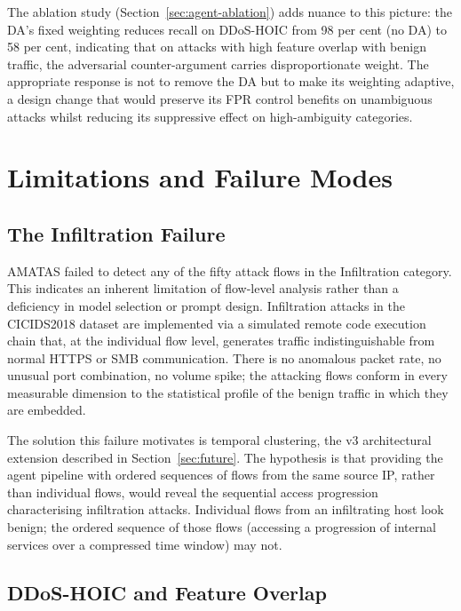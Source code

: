 \documentclass[../main.tex]{subfiles}
\begin{document}
The ablation study (Section~\ref{sec:agent-ablation}) adds nuance to this picture: the DA's fixed weighting reduces recall on DDoS-HOIC from 98 per cent (no DA) to 58 per cent, indicating that on attacks with high feature overlap with benign traffic, the adversarial counter-argument carries disproportionate weight. The appropriate response is not to remove the DA but to make its weighting adaptive, a design change that would preserve its FPR control benefits on unambiguous attacks whilst reducing its suppressive effect on high-ambiguity categories.

\section{Limitations and Failure Modes}
\label{sec:limitations}

\subsection{The Infiltration Failure}

AMATAS failed to detect any of the fifty attack flows in the Infiltration category. This indicates an inherent limitation of flow-level analysis rather than a deficiency in model selection or prompt design. Infiltration attacks in the CICIDS2018 dataset are implemented via a simulated remote code execution chain that, at the individual flow level, generates traffic indistinguishable from normal HTTPS or SMB communication. There is no anomalous packet rate, no unusual port combination, no volume spike; the attacking flows conform in every measurable dimension to the statistical profile of the benign traffic in which they are embedded.

The solution this failure motivates is temporal clustering, the v3 architectural extension described in Section~\ref{sec:future}. The hypothesis is that providing the agent pipeline with ordered sequences of flows from the same source IP, rather than individual flows, would reveal the sequential access progression characterising infiltration attacks. Individual flows from an infiltrating host look benign; the ordered sequence of those flows (accessing a progression of internal services over a compressed time window) may not.

\subsection{DDoS-HOIC and Feature Overlap}
\label{sec:hoic}
\end{document}
